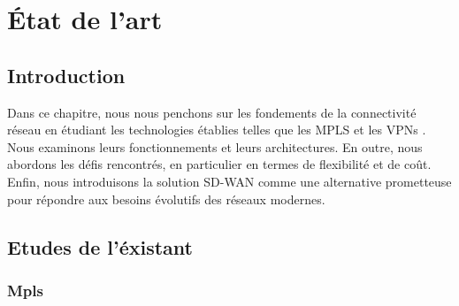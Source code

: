 
\chapter{État de l'art }



\section*{Introduction }
Dans ce chapitre, nous nous penchons sur les fondements de la connectivité réseau en étudiant les technologies établies telles que les MPLS et les VPNs . Nous examinons leurs fonctionnements et leurs architectures. En outre, nous abordons les défis rencontrés, en particulier en termes de flexibilité et de coût. Enfin, nous introduisons la solution SD-WAN comme une alternative prometteuse pour répondre aux besoins évolutifs des réseaux modernes.

\section{Etudes de l'éxistant }
\subsection{Mpls }
